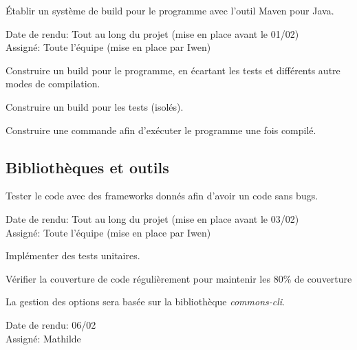\documentclass{article}
\begin{document}
\begin{nonfunctionnalneedbox}
    Établir un système de build pour le programme avec l'outil Maven pour Java. 
    \begin{duedatebox}
        Date de rendu: Tout au long du projet (mise en place avant le 01/02)\\
        Assigné: Toute l'équipe (mise en place par Iwen)
    \end{duedatebox}
    \begin{subneedbox}
        Construire un build pour le programme, en écartant les tests et différents autre modes de compilation.
    \end{subneedbox}
    \begin{subneedbox}[F9.2: Tests]
        Construire un build pour les tests (isolés).
    \end{subneedbox}
    \begin{subneedbox}[F9.3: Exécution]
        Construire une commande afin d'exécuter le programme une fois compilé.
    \end{subneedbox}
\end{nonfunctionnalneedbox}

\subsection{Bibliothèques et outils}

\begin{nonfunctionnalneedbox}
    Tester le code avec des frameworks donnés afin d'avoir un code sans bugs.
    \begin{duedatebox}
        Date de rendu: Tout au long du projet (mise en place avant le 03/02)\\
        Assigné: Toute l'équipe (mise en place par Iwen)
    \end{duedatebox}
    \begin{subneedbox}
        Implémenter des tests unitaires.
    \end{subneedbox}

    \begin{subneedbox}
        Vérifier la couverture de code régulièrement pour maintenir les 80\% de couverture
    \end{subneedbox}
\end{nonfunctionnalneedbox}

\begin{nonfunctionnalneedbox}
    La gestion des options sera basée sur la bibliothèque \textit{commons-cli}.
    \begin{duedatebox}
        Date de rendu: 06/02\\
        Assigné: Mathilde
    \end{duedatebox}
\end{nonfunctionnalneedbox}
\end{document}

